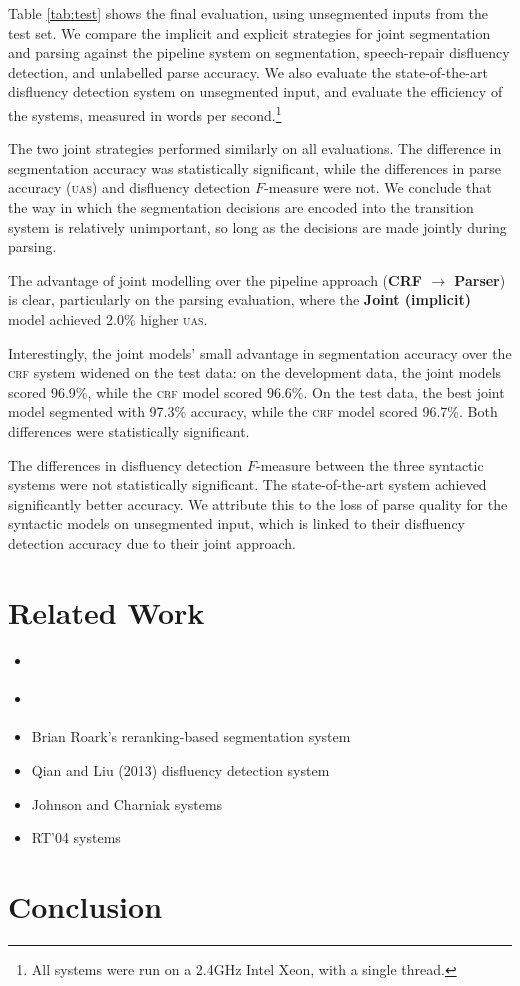 \documentclass[11pt,letterpaper]{article}
\begin{document}
Table \ref{tab:test} shows the final evaluation, using unsegmented inputs from
the test set.  We compare the implicit and explicit strategies for joint
segmentation and parsing against the pipeline system on segmentation,
speech-repair disfluency detection, and unlabelled parse accuracy.  
We also evaluate the state-of-the-art \citet{qian:13} disfluency detection system
on unsegmented input, and evaluate the efficiency of the systems, measured in
words per second.\footnote{All systems were run on a 2.4GHz Intel Xeon, with a
single thread.}

The two joint strategies performed similarly on all evaluations.
The difference in segmentation accuracy was statistically significant, while
the differences in parse accuracy (\textsc{uas}) and disfluency detection $F$-measure
were not.
We conclude that the way in which the segmentation decisions are encoded into the transition
system is relatively unimportant, so long as the decisions are made jointly during
parsing.

The advantage of joint modelling over the pipeline approach
(\textbf{CRF $\rightarrow$ Parser}) is clear, particularly
on the parsing evaluation, where the \textbf{Joint (implicit)} model achieved
2.0\% higher \textsc{uas}.

Interestingly, the joint models' small advantage in segmentation
accuracy over the \textsc{crf} system widened on the test data: on the development
data, the joint models scored 96.9\%, while the \textsc{crf} model scored 96.6\%.
On the test data, the best joint model segmented with 97.3\% accuracy, while the
\textsc{crf} model scored 96.7\%.  Both differences were statistically significant.

The differences in disfluency detection $F$-measure between the three syntactic
systems were not statistically significant.  The state-of-the-art \citet{qian:13}
system achieved significantly better accuracy.  We attribute this to the loss
of parse quality for the syntactic models on unsegmented input, which is linked
to their disfluency detection accuracy due to their joint approach.

\section{Related Work}

\begin{itemize}
    \item \citet{honnibal:14}
    \item \citet{rasooli:13}
    \item Brian Roark's reranking-based segmentation system
    \item Qian and Liu (2013) disfluency detection system
    \item Johnson and Charniak systems
    \item RT'04 systems
\end{itemize}

\newpage

\section{Conclusion}

\newpage



\end{document}

